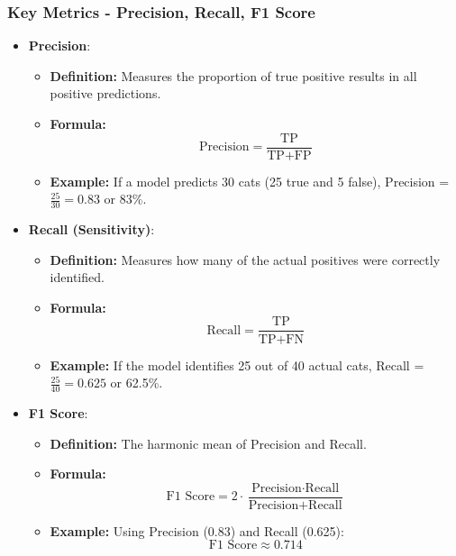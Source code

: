 \documentclass[aspectratio=169]{beamer}
\begin{document}
\begin{frame}[fragile]
    \frametitle{Key Metrics - Precision, Recall, F1 Score}
    \begin{itemize}
        \item \textbf{Precision}:
        \begin{itemize}
            \item \textbf{Definition:} Measures the proportion of true positive results in all positive predictions.
            \item \textbf{Formula:} 
            \[
            \text{Precision} = \frac{\text{TP}}{\text{TP} + \text{FP}}
            \]
            \item \textbf{Example:} If a model predicts 30 cats (25 true and 5 false), Precision = \( \frac{25}{30} = 0.83 \) or 83\%.
        \end{itemize}
        
        \item \textbf{Recall (Sensitivity)}:
        \begin{itemize}
            \item \textbf{Definition:} Measures how many of the actual positives were correctly identified.
            \item \textbf{Formula:} 
            \[
            \text{Recall} = \frac{\text{TP}}{\text{TP} + \text{FN}}
            \]
            \item \textbf{Example:} If the model identifies 25 out of 40 actual cats, Recall = \( \frac{25}{40} = 0.625 \) or 62.5\%.
        \end{itemize}
        
        \item \textbf{F1 Score}:
        \begin{itemize}
            \item \textbf{Definition:} The harmonic mean of Precision and Recall.
            \item \textbf{Formula:} 
            \[
            \text{F1 Score} = 2 \cdot \frac{\text{Precision} \cdot \text{Recall}}{\text{Precision} + \text{Recall}}
            \]
            \item \textbf{Example:} Using Precision (0.83) and Recall (0.625): 
            \[
            \text{F1 Score} \approx 0.714
            \]
        \end{itemize}
    \end{itemize}
\end{frame}
\end{document}
